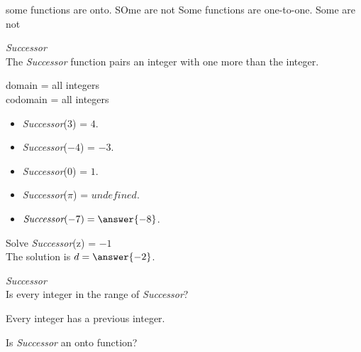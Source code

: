 \documentclass{ximera}
\begin{document}
some functions are onto. SOme are not
Some functions are one-to-one. Some are not




















\begin{question} \textit{Successor} \\
The \textit{Successor} function pairs an integer with one more than the integer.

domain = all integers  \\ 
codomain = all integers


\begin{itemize}
\item \textit{Successor}($3$) = $4$.
\item \textit{Successor}($-4$) = $-3$.
\item \textit{Successor}($0$) = $1$.
\item \textit{Successor}($\pi$) = $undefined$.

\item $\textit{Successor}(-7) = \answer{-8}$.
\end{itemize}


Solve \textit{Successor}(z) = $-1$ \\

The solution is $d = \answer{-2}$.

\end{question} 







\begin{question} \textit{Successor} \\
Is every integer in the range of \textit{Successor}?


\begin{multipleChoice}
\end{multipleChoice}
\begin{feedback}
Every integer has a previous integer.  
\end{feedback}


Is \textit{Successor} an onto function?
\begin{multipleChoice}
\end{multipleChoice}


\end{question} 
\end{document}
